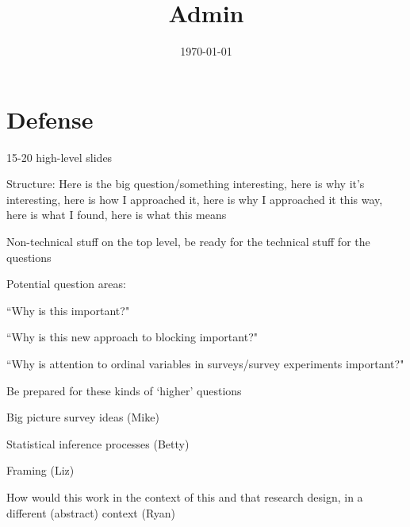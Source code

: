 \documentclass[12pt]{article}
\title{Admin}
\date{\today}
\begin{document}
\maketitle

\section*{Defense}
	\begin{coi}
		\item 15-20 high-level slides
		\item Structure: Here is the big question/something interesting, here is why it's interesting, here is how I approached it, here is why I approached it this way, here is what I found, here is what this means
		\item Non-technical stuff on the top level, be ready for the technical stuff for the questions
		\item Potential question areas:
			\begin{coi}
				\item ``Why is this important?"
				\item ``Why is this new approach to blocking important?"
				\item ``Why is attention to ordinal variables in surveys/survey experiments important?"
				\item Be prepared for these kinds of `higher' questions
				\item Big picture survey ideas (Mike)
				\item Statistical inference processes (Betty)
				\item Framing (Liz)
				\item How would this work in the context of this and that research design, in a different (abstract) context (Ryan)
			\end{coi}
	\end{coi}
\end{document}
